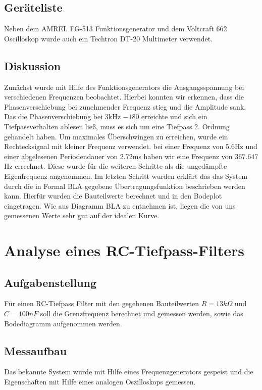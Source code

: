 \documentclass[12pt,a4paper,ngerman]{article}
\begin{document}
\subsection{Geräteliste}
Neben dem AMREL FG-513 Funktionsgenerator und dem Voltcraft 662 Oscilloskop wurde auch ein Techtron DT-20 Multimeter verwendet.
\subsection{Diskussion}

Zunächst wurde mit Hilfe des Funktionsgenerators die Ausgangsspannung bei verschiedenen Frequenzen beobachtet. Hierbei konnten wir erkennen, dass die Phasenverschiebung bei zunehmender Frequenz stieg und die Amplitude sank. Das die Phasenverschiebung bei 3kHz $-180$ erreichte und sich ein Tiefpassverhalten ablesen ließ, muss es sich um eine Tiefpass 2. Ordnung gehandelt haben.
Um maximales Überschwingen zu erreichen, wurde ein Rechtecksignal mit kleiner Frequenz verwendet. bei einer Frequenz von $5.6$Hz und einer abgelesenen Periodendauer von $2.72$ms haben wir eine Frequenz von $367.647$Hz errechnet. Diese wurde für die weiteren Schritte als die ungedämpfte Eigenfrequenz angenommen. 
Im letzten Schritt wurden erklärt das das System durch die in Formal BLA gegebene Übertragungsfunktion beschrieben werden kann. Hierfür wurden die Bauteilwerte berechnet und in den Bodeplot eingetragen. Wie aus Diagramm BLA zu entnehmen ist, liegen die von uns gemessenen Werte sehr gut auf der idealen Kurve.



\pagebreak
\section{Analyse eines RC-Tiefpass-Filters}
\subsection{Aufgabenstellung}
Für einen RC-Tiefpass Filter mit den gegebenen Bauteilwerten $R = 13k\Omega$ und $C = 100 nF$ soll die Grenzfrequenz berechnet und gemessen werden, sowie das Bodediagramm aufgenommen werden.

\subsection{Messaufbau}
Das bekannte System wurde mit Hilfe eines Frequenzgenerators gespeist und die Eigenschaften mit Hilfe eines analogen Oszilloskops gemessen.
\end{document}
